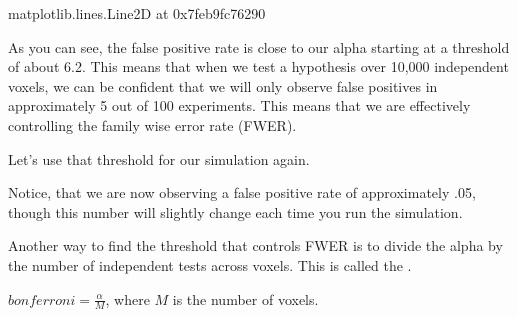 \documentclass[letterpaper,10pt,english]{sphinxmanual}
\begin{document}
\begin{sphinxVerbatim}[commandchars=\\\{\}]
\PYGZlt{}matplotlib.lines.Line2D at 0x7feb9fc76290\PYGZgt{}
\end{sphinxVerbatim}

\noindent{}

As you can see, the false positive rate is close to our alpha starting at a threshold of about 6.2. This means that when we test a hypothesis over 10,000 independent voxels, we can be confident that we will only observe false positives in approximately 5 out of 100 experiments. This means that we are effectively controlling the family wise error rate (FWER).

Let’s use that threshold for our simulation again.

\begin{sphinxVerbatim}[commandchars=\\\{\}]
   
  
\end{sphinxVerbatim}

\noindent{}

Notice, that we are now observing a false positive rate of approximately .05, though this number will slightly change each time you run the simulation.

Another way to find the threshold that controls FWER is to divide the alpha by the number of independent tests across voxels. This is called the .

\({bonferroni} = \frac{\alpha}{M}\), where \(M\) is the number of voxels.

\begin{sphinxVerbatim}[commandchars=\\\{\}]
  
  
   
  
\end{sphinxVerbatim}
\end{document}
